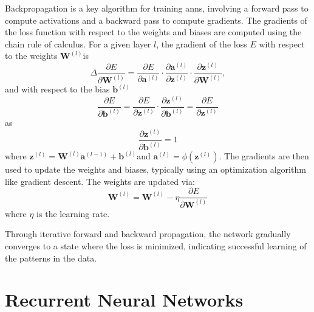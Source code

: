 \documentclass[12pt, a4paper, headinclude, twoside, plainheadsepline, open=right, numbers=noenddot, hidelinks, toc=listof, toc=bibliography]{scrreprt}
\begin{document}
Backpropagation \cite{rumelhartLearningRepresentationsBackpropagating1986} is a key algorithm for training \acp{ann}, involving a forward pass to compute activations and a backward pass to compute gradients. 
The gradients of the loss function with respect to the weights and biases are computed using the chain rule of calculus. For a given layer $l$, the gradient of the loss $E$ with respect to the weights $\mathbf{W}^{(l)}$is
\begin{equation}
\Delta
\frac{\partial E}{\partial \mathbf{W}^{(l)}} = \frac{\partial E}{\partial \mathbf{a}^{(l)}} \cdot \frac{\partial \mathbf{a}^{(l)}}{\partial \mathbf{z}^{(l)}} \cdot \frac{\partial \mathbf{z}^{(l)}}{\partial \mathbf{W}^{(l)}},
\end{equation}
and with respect to the bias $\mathbf{b}^{(l)}$
\begin{equation}
\frac{\partial E}{\partial \mathbf{b}^{(l)}} = \frac{\partial E}{\partial \mathbf{z}^{(l)}} \cdot \frac{\partial \mathbf{z}^{(l)}}{\partial \mathbf{b}^{(l)}} = \frac{\partial E}{\partial \mathbf{z}^{(l)}}
\end{equation}
as 
\begin{equation}
\frac{\partial \mathbf{z}^{(l)}}{\partial \mathbf{b}^{(l)}} = 1
\end{equation}
where $\mathbf{z}^{(l)} = \mathbf{W}^{(l)} \mathbf{a}^{(l-1)} + \mathbf{b}^{(l)}$and $\mathbf{a}^{(l)} = \phi(\mathbf{z}^{(l)})$.
The gradients are then used to update the weights and biases, typically using an optimization algorithm like gradient descent.
The weights are updated via:
\begin{equation}
\mathbf{W}^{(l)} = \mathbf{W}^{(l)} - \eta \frac{\partial E}{\partial \mathbf{W}^{(l)}}
\end{equation}
where $\eta$ is the learning rate.

Through iterative forward and backward propagation, the network gradually converges to a state where the loss is minimized, indicating successful learning of the patterns in the data.

\section{Recurrent Neural Networks}
\label{sec:rnn}
\end{document}
